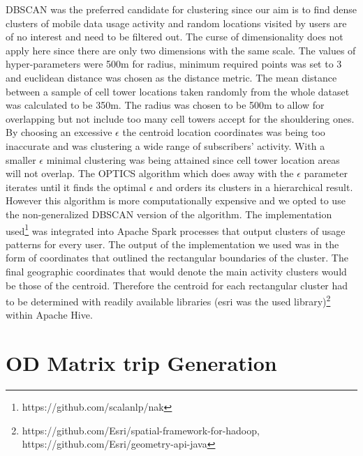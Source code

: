 \documentclass[12pt, a4paper]{report}
\theoremstyle{definition}
\theoremstyle{definition}%
\theoremstyle{definition}%
\theoremstyle{definition}%
\theoremstyle{definition}%
\theoremstyle{definition}%
\begin{document}
DBSCAN was the preferred candidate for clustering since our aim is to find dense clusters of mobile data usage activity and random locations visited by users are of no interest and need to be filtered out. The curse of dimensionality does not apply here since there are only two dimensions with the same scale.  The values of hyper-parameters were 500m for radius, minimum required points was set to 3 and euclidean distance was chosen as the distance metric. The mean distance between a sample of cell tower locations taken randomly from the whole dataset was calculated to be 350m. The radius was chosen to be 500m to allow for overlapping but not include too many cell towers accept for the shouldering ones. By choosing an excessive $\epsilon$ the centroid location coordinates was being too inaccurate and was clustering a wide range of subscribers' activity. With a smaller $\epsilon$ minimal clustering was being attained since cell tower location areas will not overlap. The OPTICS algorithm which does away with the $\epsilon$ parameter iterates until it finds the optimal $\epsilon$ and orders its clusters in a hierarchical result. However this algorithm is more computationally expensive and we opted to use the non-generalized DBSCAN version of the algorithm. The implementation used\footnote{https://github.com/scalanlp/nak} was integrated into Apache Spark processes that output clusters of usage patterns for every user. The output of the implementation we used was in the form of coordinates that outlined the rectangular boundaries of the cluster. The final geographic coordinates that would denote the main activity clusters would be those of the centroid. Therefore the centroid for each rectangular cluster had to be determined with readily available libraries (esri was the used library)\footnote{https://github.com/Esri/spatial-framework-for-hadoop, https://github.com/Esri/geometry-api-java} within Apache Hive.   






\section{OD Matrix trip Generation}  \label{section:odmatrix_trip_generation}
\end{document}
